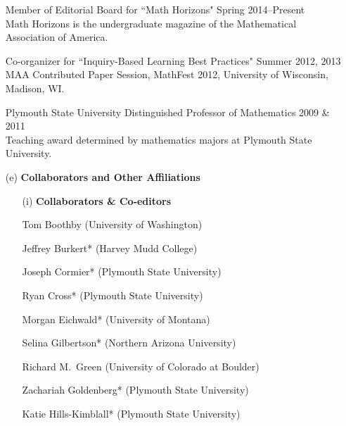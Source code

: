 \documentclass[11pt]{article}
\begin{document}
\begin{enumerate}[leftmargin=*]
\smallskip

Member of Editorial Board for ``Math Horizons" \hfill Spring 2014--Present\\
Math Horizons is the undergraduate magazine of the Mathematical Association of America.

\smallskip

Co-organizer for ``Inquiry-Based Learning Best Practices" \hfill Summer 2012, 2013\\
MAA Contributed Paper Session, MathFest 2012, University of Wisconsin, Madison, WI.

\smallskip

%
 
Plymouth State University Distinguished Professor of Mathematics \hfill 2009 \& 2011\\
Teaching award determined by mathematics majors at Plymouth State University.

\item[(e)] \textbf{Collaborators and Other Affiliations} 
 
\begin{enumerate}[leftmargin=\parindent]
\item[(i)] \textbf{Collaborators \& Co-editors}

% 

Tom Boothby (University of Washington)

Jeffrey Burkert* (Harvey Mudd College)

Joseph Cormier* (Plymouth State University)

Ryan Cross* (Plymouth State University)

Morgan Eichwald* (University of Montana)

Selina Gilbertson* (Northern Arizona University)

Richard M.~Green (University of Colorado at Boulder)

Zachariah Goldenberg* (Plymouth State University)

Katie Hills-Kimblall* (Plymouth State University)


\end{enumerate}
\end{enumerate}
\end{document}
